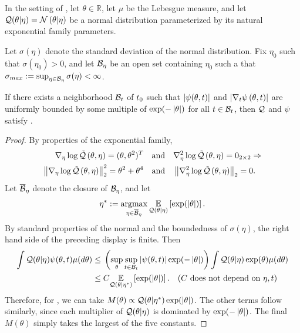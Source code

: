 \begin{lem}
%
In the setting of , let $\theta \in \mathbb{R}$, let
$\mu$ be the Lebesgue measure, and let $\mathcal{Q}(\theta \vert \eta) = \mathcal{N}\left(\theta
\vert \eta\right)$ be a normal distribution parameterized by its natural exponential
family parameters.

Let $\sigma(\eta)$ denote the standard deviation of the normal distribution.
Fix $\eta_0$ such that $\sigma(\eta_0) > 0$, and let $\mathcal{B}_\eta$ be an open set
containing $\eta_0$ such a that $\sigma_{max} := \sup_{\eta \in \mathcal{B}_\eta}
\sigma(\eta) < \infty$.

If there exists a neighborhood $\mathcal{B}_t$ of $t_0$ such that $\left|\psi(\theta,
t)\right|$ and $\left|{\nabla_t \psi}\left(\theta, t\right)\right|$ are uniformly bounded by some multiple of
$\exp(-\left|\theta\right|)$ for all $t \in \mathcal{B}_t$, then $\mathcal{Q}$ and $\psi$ satisfy
.

\begin{proof}
%
By properties of the exponential family,
%
\begin{align*}
%
\lqgrad{\theta, \eta} ={} (\theta, \theta^2)^T \mathand&
\lqhess{\theta, \eta} ={} 0_{2\times2} \Rightarrow\\
%
\norm{\lqgrad{\theta, \eta}}_2^2 ={} \theta^2 + \theta^4 \mathand&
\norm{\lqhess{\theta, \eta}}_2 ={} 0.
%
\end{align*}
%
Let $\overline{\mathcal{B}}_\eta$ denote the closure of $\mathcal{B}_\eta$, and let
%
\begin{align*}
%
\eta^* := \argmax_{\eta \in \ballclosed_\eta}
    \expect{\q(\theta \vert \eta)}{\exp(\abs{\theta})}.
%
\end{align*}
%
By standard properties of the normal and the boundedness of $\sigma(\eta)$, the
right hand side of the preceding display is finite.
%
Then
%
\begin{align*}
\int \q(\theta \vert \eta) \psi(\theta, \t) \mu(d \theta) \le{}&
    \left( \sup_{\theta} \sup_{\t \in \ball_\t}
        \abs{\psi(\theta, \t)} \exp(-\abs{\theta}) \right)
    \int \q(\theta \vert \eta) \exp(\theta) \mu(d \theta)
%
\\\le{}&
    \const
    \expect{\q(\theta \vert \eta^*)}{\exp(\abs{\theta})}.
    \quad\constdesc{\eta, \t}
%
\end{align*}
%
Therefore, for , we can take $M(\theta)
\propto \mathcal{Q}(\theta \vert \eta^*) \exp(\left|\theta\right|)$. The other terms follow
similarly, since each multiplier of $\mathcal{Q}(\theta \vert \eta)$ is dominated by
$\exp(-\left|\theta\right|)$.  The final $M(\theta)$ simply takes the largest
of the five constants.
%
\end{proof}
%
\end{lem}

